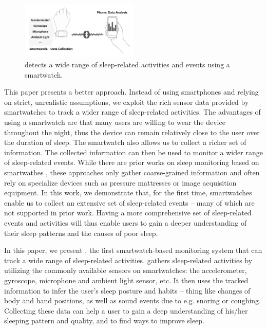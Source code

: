 \begin{figure}[!t]
\centering
\setlength{\belowcaptionskip}{-13pt}
      \includegraphics[width=0.5\textwidth]{Figures/datacollect.pdf}
  \caption{{\systemname} detects a wide range of sleep-related activities and events using a smartwatch.}\label{fig:datacollect}
\end{figure}

This paper presents a better approach. Instead of using smartphones and relying on strict, unrealistic assumptions, we exploit the rich
sensor data provided by smartwatches to track a wider range of sleep-related activities. The advantages of using a smartwatch are that
many users are willing to wear the device throughout the night, thus the device can remain relatively close to the user over the duration
of sleep.  The smartwatch also allows us to collect a richer set of information. The collected information can then be used to monitor a
wider range of sleep-related events. While there are prior works on sleep monitoring based on smartwathes
\cite{pombo2016ubisleep,shelgikar2016sleep,haescher2015anomaly,borazio2012combining}, these approaches only gather coarse-grained
information and often rely on specialize devices such as pressure mattresses or image acquisition equipment. In this work, we demonstrate
that, for the first time, smartwatches enable us to collect an extensive set of sleep-related events -- many of which are not supported in
prior work. Having a more comprehensive set of sleep-related events and activities will thus enable users to gain a deeper understanding of
their sleep patterns and the causes of poor sleep.



In this paper, we present \systemname, the first smartwatch-based monitoring system that can track a wide range of sleep-related
activities. \systemname gathers sleep-related activities by utilizing the commonly available sensors on smartwatches: the accelerometer,
gyroscope, microphone and ambient light sensor, etc. It then uses the tracked information to infer the user's sleep posture and habits --
thing like changes of body and hand positions, as well as sound events due to e.g. snoring or coughing.  Collecting these data can help a
user to gain a deep understanding of his/her sleeping pattern and quality, and to find ways to improve sleep.

